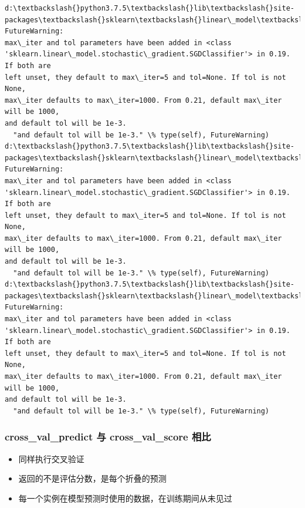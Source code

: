 \documentclass[11pt]{article}
\providecommand{\tightlist}{%
      \setlength{\itemsep}{0pt}\setlength{\parskip}{0pt}}
\begin{document}
    \begin{Verbatim}[commandchars=\\\{\}]
d:\textbackslash{}python3.7.5\textbackslash{}lib\textbackslash{}site-
packages\textbackslash{}sklearn\textbackslash{}linear\_model\textbackslash{}stochastic\_gradient.py:128: FutureWarning:
max\_iter and tol parameters have been added in <class
'sklearn.linear\_model.stochastic\_gradient.SGDClassifier'> in 0.19. If both are
left unset, they default to max\_iter=5 and tol=None. If tol is not None,
max\_iter defaults to max\_iter=1000. From 0.21, default max\_iter will be 1000,
and default tol will be 1e-3.
  "and default tol will be 1e-3." \% type(self), FutureWarning)
d:\textbackslash{}python3.7.5\textbackslash{}lib\textbackslash{}site-
packages\textbackslash{}sklearn\textbackslash{}linear\_model\textbackslash{}stochastic\_gradient.py:128: FutureWarning:
max\_iter and tol parameters have been added in <class
'sklearn.linear\_model.stochastic\_gradient.SGDClassifier'> in 0.19. If both are
left unset, they default to max\_iter=5 and tol=None. If tol is not None,
max\_iter defaults to max\_iter=1000. From 0.21, default max\_iter will be 1000,
and default tol will be 1e-3.
  "and default tol will be 1e-3." \% type(self), FutureWarning)
d:\textbackslash{}python3.7.5\textbackslash{}lib\textbackslash{}site-
packages\textbackslash{}sklearn\textbackslash{}linear\_model\textbackslash{}stochastic\_gradient.py:128: FutureWarning:
max\_iter and tol parameters have been added in <class
'sklearn.linear\_model.stochastic\_gradient.SGDClassifier'> in 0.19. If both are
left unset, they default to max\_iter=5 and tol=None. If tol is not None,
max\_iter defaults to max\_iter=1000. From 0.21, default max\_iter will be 1000,
and default tol will be 1e-3.
  "and default tol will be 1e-3." \% type(self), FutureWarning)
    \end{Verbatim}

    \hypertarget{cross_val_predict-ux4e0e-cross_val_score-ux76f8ux6bd4}{%
\subsubsection{cross\_val\_predict 与 cross\_val\_score
相比}\label{cross_val_predict-ux4e0e-cross_val_score-ux76f8ux6bd4}}

\begin{itemize}
\tightlist
\item
  同样执行交叉验证
\item
  返回的不是评估分数，是每个折叠的预测
\item
  每一个实例在模型预测时使用的数据，在训练期间从未见过
\end{itemize}
\end{document}
